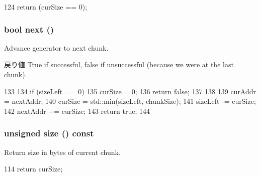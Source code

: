 \begin{DoxyCode}
124 { return (curSize == 0); }
\end{DoxyCode}
\hypertarget{classChunkGenerator_a80870c233d0237e3588a2d6f8d176916}{
\subsubsection[{next}]{\setlength{\rightskip}{0pt plus 5cm}bool next ()}}
\label{classChunkGenerator_a80870c233d0237e3588a2d6f8d176916}
Advance generator to next chunk. \begin{DoxyReturn}{戻り値}
True if successful, false if unsuccessful (because we were at the last chunk). 
\end{DoxyReturn}



\begin{DoxyCode}
133     {
134         if (sizeLeft == 0) {
135             curSize = 0;
136             return false;
137         }
138 
139         curAddr = nextAddr;
140         curSize = std::min(sizeLeft, chunkSize);
141         sizeLeft -= curSize;
142         nextAddr += curSize;
143         return true;
144     }
\end{DoxyCode}
\hypertarget{classChunkGenerator_acdb549c592f948a9d973d4d84b02ef87}{
\subsubsection[{size}]{\setlength{\rightskip}{0pt plus 5cm}unsigned size () const}}
\label{classChunkGenerator_acdb549c592f948a9d973d4d84b02ef87}
Return size in bytes of current chunk. 


\begin{DoxyCode}
114 { return curSize; }
\end{DoxyCode}


